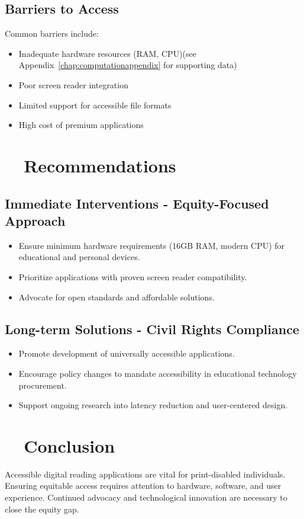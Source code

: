 \subsection{Barriers to Access}
Common barriers include:
\begin{itemize}
	\item Inadequate hardware resources (RAM, CPU)(see Appendix~\ref{chap:computationappendix} for supporting data)\supercite{EquityViolationData}
	\item Poor screen reader integration\supercite{Smith2022, Leporini2004}
	\item Limited support for accessible file formats\supercite{Jones2021, DAISYWiki, CNIBEPUB}
	\item High cost of premium applications\supercite{Lee2019, DolphinScreenreaderPricing}
\end{itemize}

\section{~~Recommendations}
\subsection{Immediate Interventions - Equity-Focused Approach}
\begin{itemize}
	\item Ensure minimum hardware requirements (16GB RAM, modern CPU) for educational and personal devices\supercite{EducationalEquityReport2024}.
	\item Prioritize applications with proven screen reader compatibility\supercite{WebAIMSurvey}.
	\item Advocate for open standards and affordable solutions\supercite{Stallman2002}.
\end{itemize}

\subsection{Long-term Solutions - Civil Rights Compliance}
\begin{itemize}
	\item Promote development of universally accessible applications\supercite{Burgstahler2015, A11yProject}.
	\item Encourage policy changes to mandate accessibility in educational technology procurement\supercite{Lazar2015, USAccessBoard2018}.
	\item Support ongoing research into latency reduction and user-centered design\supercite{Fowler2011ScreenReaderLatency, RichScreenReaderExperiences}.
\end{itemize}

\section{~~Conclusion}
Accessible digital reading applications are vital for print-disabled individuals. Ensuring equitable access requires attention to hardware, software, and user experience. Continued advocacy and technological innovation are necessary to close the equity gap\supercite{Kim2023, Brown2022, DiMaggio2001FromUnequalAccess}.
